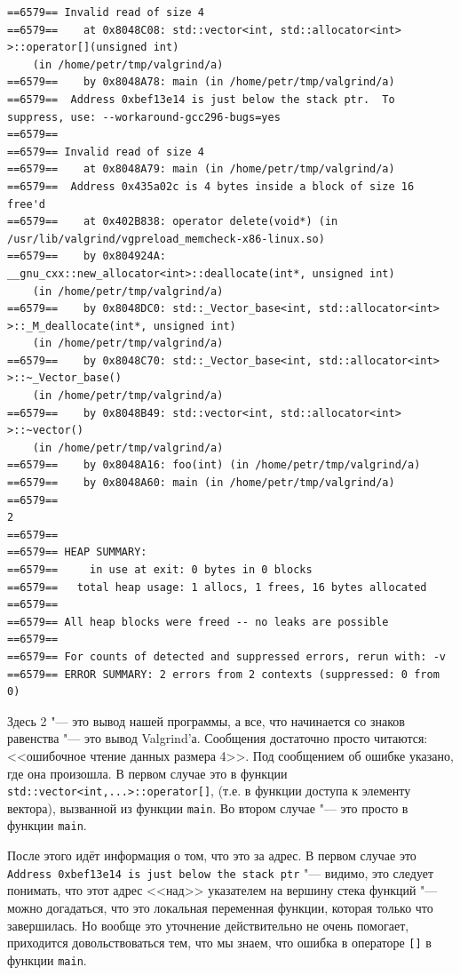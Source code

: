 \documentclass[a4paper,10pt]{problems}
\begin{document}
{\footnotesize
\begin{verbatim}
==6579== Invalid read of size 4
==6579==    at 0x8048C08: std::vector<int, std::allocator<int> >::operator[](unsigned int) 
    (in /home/petr/tmp/valgrind/a)
==6579==    by 0x8048A78: main (in /home/petr/tmp/valgrind/a)
==6579==  Address 0xbef13e14 is just below the stack ptr.  To suppress, use: --workaround-gcc296-bugs=yes
==6579== 
==6579== Invalid read of size 4
==6579==    at 0x8048A79: main (in /home/petr/tmp/valgrind/a)
==6579==  Address 0x435a02c is 4 bytes inside a block of size 16 free'd
==6579==    at 0x402B838: operator delete(void*) (in /usr/lib/valgrind/vgpreload_memcheck-x86-linux.so)
==6579==    by 0x804924A: __gnu_cxx::new_allocator<int>::deallocate(int*, unsigned int) 
    (in /home/petr/tmp/valgrind/a)
==6579==    by 0x8048DC0: std::_Vector_base<int, std::allocator<int> >::_M_deallocate(int*, unsigned int) 
    (in /home/petr/tmp/valgrind/a)
==6579==    by 0x8048C70: std::_Vector_base<int, std::allocator<int> >::~_Vector_base() 
    (in /home/petr/tmp/valgrind/a)
==6579==    by 0x8048B49: std::vector<int, std::allocator<int> >::~vector() 
    (in /home/petr/tmp/valgrind/a)
==6579==    by 0x8048A16: foo(int) (in /home/petr/tmp/valgrind/a)
==6579==    by 0x8048A60: main (in /home/petr/tmp/valgrind/a)
==6579== 
2
==6579== 
==6579== HEAP SUMMARY:
==6579==     in use at exit: 0 bytes in 0 blocks
==6579==   total heap usage: 1 allocs, 1 frees, 16 bytes allocated
==6579== 
==6579== All heap blocks were freed -- no leaks are possible
==6579== 
==6579== For counts of detected and suppressed errors, rerun with: -v
==6579== ERROR SUMMARY: 2 errors from 2 contexts (suppressed: 0 from 0)                                                                                                                                                                                                        \end{verbatim}
\par
}
\noindent
Здесь 2 "--- это вывод нашей программы, а все, что начинается со знаков равенства "--- это вывод Val\-grind'а. 
Сообщения достаточно просто читаются: <<ошибочное чтение данных размера 4>>. 
Под сообщением об ошибке указано, где она произошла. В первом случае это в функции \verb`std::vector<int,...>::operator[]`, 
(т.е. в функции доступа к элементу вектора), вызванной из функции \verb`main`. Во втором случае "--- это просто в функции \verb`main`.

После этого идёт информация о том, что это за адрес. В первом случае это \texttt{Address 0xbef13e14 is just below the stack ptr} "---
видимо, это следует понимать, что этот адрес <<над>> указателем на вершину стека функций "--- можно догадаться, что это локальная переменная
функции, которая только что завершилась. Но вообще это уточнение действительно не очень помогает, приходится довольствоваться тем, что мы знаем, что
ошибка в операторе \verb`[]` в функции \verb`main`.
\end{document}
